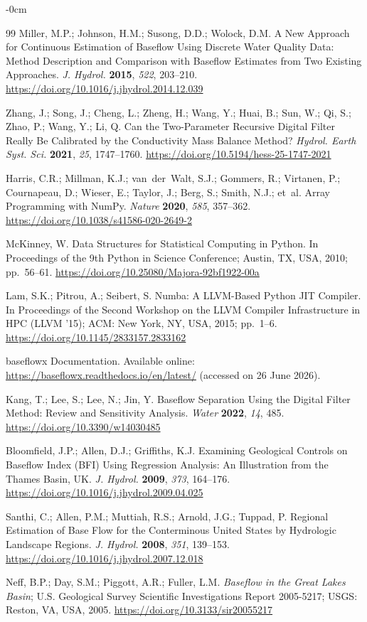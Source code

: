 \documentclass[hydrology,article,submit,pdftex,moreauthors]{Definitions/mdpi}
\begin{document}
\begin{adjustwidth}{-\extralength}{0cm}
\begin{thebibliography}{99}
Miller, M.P.; Johnson, H.M.; Susong, D.D.; Wolock, D.M. A New Approach for Continuous Estimation of Baseflow Using Discrete Water Quality Data: Method Description and Comparison with Baseflow Estimates from Two Existing Approaches. \textit{J. Hydrol.} \textbf{2015}, \textit{522}, 203--210. \url{https://doi.org/10.1016/j.jhydrol.2014.12.039}

Zhang, J.; Song, J.; Cheng, L.; Zheng, H.; Wang, Y.; Huai, B.; Sun, W.; Qi, S.; Zhao, P.; Wang, Y.; Li, Q. Can the Two-Parameter Recursive Digital Filter Really Be Calibrated by the Conductivity Mass Balance Method? \textit{Hydrol. Earth Syst. Sci.} \textbf{2021}, \textit{25}, 1747--1760. \url{https://doi.org/10.5194/hess-25-1747-2021}

Harris, C.R.; Millman, K.J.; van~der~Walt, S.J.; Gommers, R.; Virtanen, P.; Cournapeau, D.; Wieser, E.; Taylor, J.; Berg, S.; Smith, N.J.; et~al. Array Programming with NumPy. \textit{Nature} \textbf{2020}, \textit{585}, 357--362. \url{https://doi.org/10.1038/s41586-020-2649-2}

McKinney, W. Data Structures for Statistical Computing in Python. In Proceedings of the 9th Python in Science Conference; Austin, TX, USA, 2010; pp.~56--61. \url{https://doi.org/10.25080/Majora-92bf1922-00a}

Lam, S.K.; Pitrou, A.; Seibert, S. Numba: A LLVM-Based Python JIT Compiler. In Proceedings of the Second Workshop on the LLVM Compiler Infrastructure in HPC (LLVM '15); ACM: New York, NY, USA, 2015; pp.~1--6. \url{https://doi.org/10.1145/2833157.2833162}

baseflowx Documentation. Available online: \url{https://baseflowx.readthedocs.io/en/latest/} (accessed on 26 June 2026).

Kang, T.; Lee, S.; Lee, N.; Jin, Y. Baseflow Separation Using the Digital Filter Method: Review and Sensitivity Analysis. \textit{Water} \textbf{2022}, \textit{14}, 485. \url{https://doi.org/10.3390/w14030485}

Bloomfield, J.P.; Allen, D.J.; Griffiths, K.J. Examining Geological Controls on Baseflow Index (BFI) Using Regression Analysis: An Illustration from the Thames Basin, UK. \textit{J. Hydrol.} \textbf{2009}, \textit{373}, 164--176. \url{https://doi.org/10.1016/j.jhydrol.2009.04.025}

Santhi, C.; Allen, P.M.; Muttiah, R.S.; Arnold, J.G.; Tuppad, P. Regional Estimation of Base Flow for the Conterminous United States by Hydrologic Landscape Regions. \textit{J. Hydrol.} \textbf{2008}, \textit{351}, 139--153. \url{https://doi.org/10.1016/j.jhydrol.2007.12.018}

Neff, B.P.; Day, S.M.; Piggott, A.R.; Fuller, L.M. \textit{Baseflow in the Great Lakes Basin}; U.S. Geological Survey Scientific Investigations Report 2005-5217; USGS: Reston, VA, USA, 2005. \url{https://doi.org/10.3133/sir20055217}

\end{thebibliography}

\end{adjustwidth}
\end{document}
